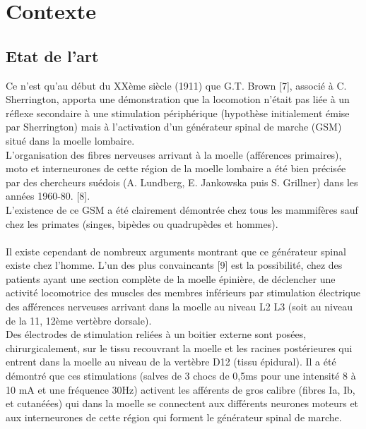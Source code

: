\documentclass{report}
\begin{document}
\chapter{Contexte}

\section{Etat de l'art}

Ce n'est qu'au d\'{e}but du XX\`{e}me si\`{e}cle (1911) que G.T. Brown [7], associ\'{e} \`{a} C. Sherrington,
apporta une d\'{e}monstration que la locomotion n'\'{e}tait pas li\'{e}e \`{a} un r\'{e}flexe secondaire \`{a} une
stimulation p\'{e}riph\'{e}rique (hypoth\`{e}se initialement \'{e}mise par Sherrington) mais \`{a} l'activation
d'un g\'{e}n\'{e}rateur spinal de marche (GSM) situ\'{e} dans la moelle lombaire.\\
L'organisation des fibres nerveuses arrivant \`{a} la moelle (aff\'{e}rences primaires), moto et interneurones de cette r\'{e}gion de la moelle lombaire a \'{e}t\'{e} bien pr\'{e}cis\'{e}e par des chercheurs
su\'{e}dois (A. Lundberg, E. Jankowska puis S. Grillner) dans les ann\'{e}es 1960-80. [8].\\
L'existence de ce GSM a \'{e}t\'{e} clairement d\'{e}montr\'{e}e chez tous les mammif\`{e}res sauf chez les
primates (singes, bip\`{e}des ou quadrup\`{e}des et hommes).\\ \\

Il existe cependant de nombreux arguments montrant que ce g\'{e}n\'{e}rateur spinal existe chez
l'homme. L'un des plus convaincants [9] est la possibilit\'{e}, chez des patients ayant une
section compl\`{e}te de la moelle \'{e}pini\`{e}re, de d\'{e}clencher une activit\'{e} locomotrice des muscles
des membres inf\'{e}rieurs par stimulation \'{e}lectrique des aff\'{e}rences nerveuses arrivant dans la
moelle au niveau L2 L3 (soit au niveau de la 11, 12\`{e}me vert\`{e}bre dorsale).\\
Des \'{e}lectrodes de stimulation reli\'{e}es \`{a} un boitier externe sont pos\'{e}es, chirurgicalement, sur
le tissu recouvrant la moelle et les racines post\'{e}rieures qui entrent dans la moelle au niveau
de la vert\`{e}bre D12 (tissu \'{e}pidural). Il a \'{e}t\'{e} d\'{e}montr\'{e} que ces stimulations (salves de 3 chocs
de 0,5ms pour une intensit\'{e} 8 \`{a} 10 mA et une fr\'{e}quence 30Hz) activent les aff\'{e}rents de gros
calibre (fibres Ia, Ib, et cutan\'{e}\'{e}es) qui dans la moelle se connectent aux diff\'{e}rents neurones
moteurs et aux interneurones de cette r\'{e}gion qui forment le g\'{e}n\'{e}rateur spinal de marche.\\ \\
\end{document}
